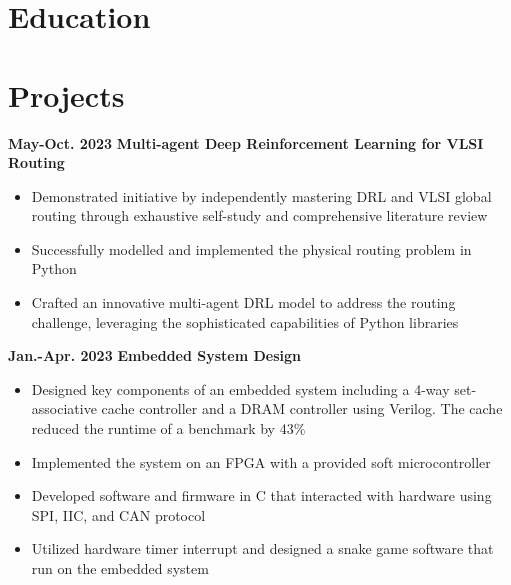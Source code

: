 \documentclass[11pt,a4paper,sans]{moderncv}
\begin{document}
\makecvtitle

\section{Education}

\section{Projects}

\cventry
{\textnormal{\textbf{May-Oct. 2023}}}
{\textnormal{\textbf{Multi-agent Deep Reinforcement Learning for VLSI Routing}}}
{}{}{}
{
    \begin{itemize}
    \item Demonstrated initiative by independently mastering DRL and VLSI global routing through exhaustive self-study and comprehensive literature review
    \item Successfully modelled and implemented the physical routing problem in Python
    \item Crafted an innovative multi-agent DRL model to address the routing challenge, leveraging the sophisticated capabilities of Python libraries
\end{itemize}
}

\cventry
{\textnormal{\textbf{Jan.-Apr. 2023}}}
{\textnormal{\textbf{Embedded System Design}}}
{}{}{}
{
    \begin{itemize}
    \item Designed key components of an embedded system including a 4-way set-associative cache controller and a DRAM controller using Verilog. The cache reduced the runtime of a benchmark by 43\%
    \item Implemented the system on an FPGA with a provided soft microcontroller 
    \item Developed software and firmware in C that interacted with hardware using SPI, IIC, and CAN protocol 
    \item Utilized hardware timer interrupt and designed a snake game software that run on the embedded system
\end{itemize}
}
\end{document}
